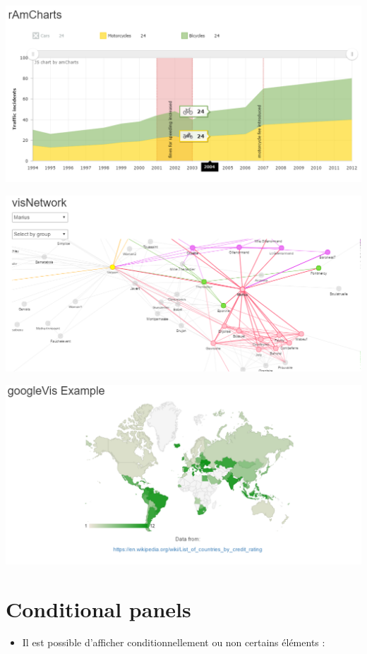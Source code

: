 \documentclass[
]{article}
\providecommand{\tightlist}{%
  \setlength{\itemsep}{0pt}\setlength{\parskip}{0pt}}
\begin{document}
\includegraphics{img/ramcharts.png}

\includegraphics{img/visnetwork.png}

\includegraphics{img/ggvis.png}

\hypertarget{conditional-panels}{%
\section{Conditional panels}\label{conditional-panels}}

\begin{itemize}
\tightlist
\item
  Il est possible d'afficher conditionnellement ou non certains éléments
  :
\end{itemize}
\end{document}
